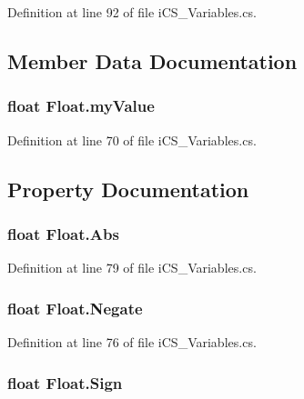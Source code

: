 Definition at line 92 of file i\+C\+S\+\_\+\+Variables.\+cs.



\subsection{Member Data Documentation}
\hypertarget{struct_float_afe3c4ce011a8f5f370400321e34a01f2}{
\subsubsection[{my\+Value}]{\setlength{\rightskip}{0pt plus 5cm}float Float.\+my\+Value}}\label{struct_float_afe3c4ce011a8f5f370400321e34a01f2}


Definition at line 70 of file i\+C\+S\+\_\+\+Variables.\+cs.



\subsection{Property Documentation}
\hypertarget{struct_float_ad4f1c61102b96fd84bf6a8fc29c415da}{
\subsubsection[{Abs}]{\setlength{\rightskip}{0pt plus 5cm}float Float.\+Abs\hspace{0.3cm}{\ttfamily [get]}}}\label{struct_float_ad4f1c61102b96fd84bf6a8fc29c415da}


Definition at line 79 of file i\+C\+S\+\_\+\+Variables.\+cs.

\hypertarget{struct_float_aadfa3393561599aace320aed12abbbdf}{
\subsubsection[{Negate}]{\setlength{\rightskip}{0pt plus 5cm}float Float.\+Negate\hspace{0.3cm}{\ttfamily [get]}}}\label{struct_float_aadfa3393561599aace320aed12abbbdf}


Definition at line 76 of file i\+C\+S\+\_\+\+Variables.\+cs.

\hypertarget{struct_float_a6ed15f1070c8f097c0fd47c547b3e3d6}{
\subsubsection[{Sign}]{\setlength{\rightskip}{0pt plus 5cm}float Float.\+Sign\hspace{0.3cm}{\ttfamily [get]}}}\label{struct_float_a6ed15f1070c8f097c0fd47c547b3e3d6}


